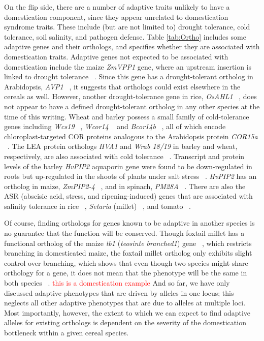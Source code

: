 \documentclass[12pt]{article}
\newcommand{\mbh}[1]{\textcolor{red}{\normalsize  #1}}
\begin{document}
On the flip side, there are a number of adaptive traits unlikely to have a domestication component, since they appear unrelated to domestication syndrome traits.
These include (but are not limited to) drought tolerance, cold tolerance, soil salinity, and pathogen defense.
Table \ref{tab:Ortho} includes some adaptive genes and their orthologs, and specifies whether they are associated with domestication traits.
Adaptive genes not expected to be associated with domestication include the maize \textit{ZmVPP1} gene, where an upstream insertion is linked to drought tolerance ~\citep{Wang2016}.
Since this gene has a drought-tolerant ortholog in Arabidopsis, \textit{AVP1} ~\citep{Gaxiola2001}, it suggests that orthologs could exist elsewhere in the cereals as well.
However, another drought-tolerance gene in rice, \textit{OsAHL1} ~\citep{Zhou2016}, does not appear to have a defined drought-tolerant ortholog in any other species at the time of this writing.
Wheat and barley possess a small family of cold-tolerance genes including \textit{Wcs19} ~\citep{pmid8219063}, \textit{Wcor14} ~\citep{pmid10846621} and \textit{Bcor14b} ~\citep{pmid9952464}, all of which encode chloroplast-targeted COR proteins analogous to the Arabidopsis protein \textit{COR15a}  ~\citep{pmid9826741, Takumi2003}.
The LEA protein orthologs \textit{HVA1} and \textit{Wrab 18/19} in barley and wheat, respectively, are also associated with cold tolerance ~\citep{Hong1988, pmid16755132}.
Transcript and protein levels of the barley \textit{HvPIP2} aquaporin gene were found to be down-regulated in roots but up-regulated in the shoots of plants under salt stress ~\citep{Katsuhara2002}.
\textit{HvPIP2} has an ortholog in maize, \textit{ZmPIP2-4} ~\citep{Zhu2005}, and in spinach, \textit{PM28A} ~\citep{Fotiadis2000}.
There are also the ASR (abscisic acid, stress, and ripening-induced) genes that are associated with salinity tolerance in rice ~\citep{Joo2013}, \textit{Setaria} (millet) ~\citep{Li2017}, and tomato ~\citep{Konrad2008}. 

Of course, finding orthologs for genes known to be adaptive in another species is no guarantee that the function will be conserved.
Though foxtail millet has a functional ortholog of the maize \textit{tb1} (\textit{teosinte branched1}) gene ~\citep{pmid9087405}, which restricts branching in domesticated maize, the foxtail millet ortholog only exhibits slight control over branching, which shows that even though two species might share orthology for a gene, it does not mean that the phenotype will be the same in both species ~\citep{Doust2004}. \mbh{this is a domestication example}
And so far, we have only discussed adaptive phenotypes that are driven by alleles in one locus; this neglects all other adaptive phenotypes that are due to alleles at multiple loci.
Most importantly, however, the extent to which we can expect to find adaptive alleles for existing orthologs is dependent on the severity of the domestication bottleneck within a given cereal species.
\end{document}
